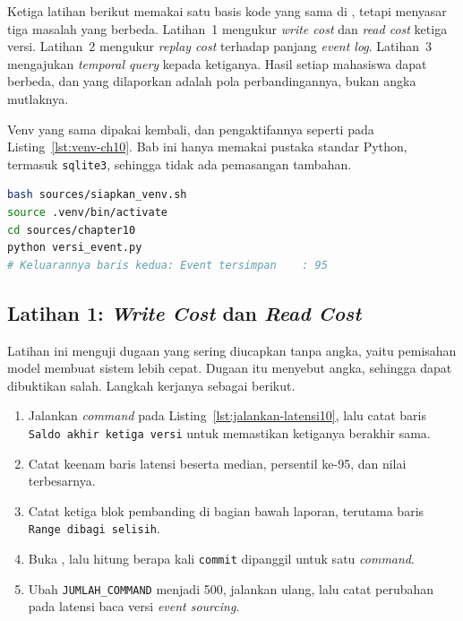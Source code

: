 Ketiga latihan berikut memakai satu basis kode yang sama di
, tetapi menyasar tiga masalah yang berbeda.
Latihan~1 mengukur \textit{write cost} dan \textit{read cost} ketiga versi.
Latihan~2 mengukur \textit{replay cost} terhadap panjang \textit{event log}.
Latihan~3 mengajukan \textit{temporal query} kepada ketiganya. Hasil setiap
mahasiswa dapat
berbeda, dan yang dilaporkan adalah pola perbandingannya, bukan angka
mutlaknya.

Venv yang sama dipakai kembali, dan pengaktifannya seperti pada
Listing~\ref{lst:venv-ch10}. Bab ini hanya memakai pustaka standar Python,
termasuk \texttt{sqlite3}, sehingga tidak ada pemasangan tambahan.

\begin{lstlisting}[language=bash, caption={Menyiapkan bahan sebelum ketiga
  latihan, skrip tersedia di \berkas{sources/siapkan_venv.sh}},
  label=lst:venv-ch10]
bash sources/siapkan_venv.sh
source .venv/bin/activate
cd sources/chapter10
python versi_event.py
# Keluarannya baris kedua: Event tersimpan    : 95
\end{lstlisting}

\subsection*{Latihan 1: \textit{Write Cost} dan \textit{Read Cost}}

Latihan ini menguji dugaan yang sering diucapkan tanpa angka, yaitu pemisahan
model membuat sistem lebih cepat. Dugaan itu menyebut angka, sehingga dapat
dibuktikan salah. Langkah kerjanya sebagai berikut.

\begin{enumerate}
  \item Jalankan \textit{command} pada Listing~\ref{lst:jalankan-latensi10}, lalu catat
    baris \texttt{Saldo akhir ketiga versi} untuk memastikan ketiganya berakhir
    sama.
  \item Catat keenam baris latensi beserta median, persentil ke-95, dan nilai
    terbesarnya.
  \item Catat ketiga blok pembanding di bagian bawah laporan, terutama baris
    \texttt{Range dibagi selisih}.
  \item Buka , lalu hitung berapa kali
    \texttt{commit} dipanggil untuk satu \textit{command}.
  \item Ubah \texttt{JUMLAH\_COMMAND} menjadi 500, jalankan ulang, lalu catat
    perubahan pada latensi baca versi \textit{event sourcing}.
\end{enumerate}

